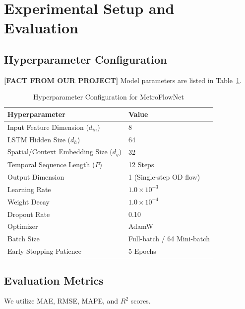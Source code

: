 \documentclass[conference]{IEEEtran}
\begin{document}
\section{Experimental Setup and Evaluation}
\label{sec:experiments}

\subsection{Hyperparameter Configuration}
\noindent \textbf{[FACT FROM OUR PROJECT]} Model parameters are listed in Table~\ref{tab:model_config}.

\begin{table}[htbp]
\caption{Hyperparameter Configuration for MetroFlowNet}
\label{tab:model_config}
\centering
\begin{tabular}{ll}
\toprule
\textbf{Hyperparameter} & \textbf{Value} \\
\midrule
Input Feature Dimension ($d_{in}$) & 8 \\
LSTM Hidden Size ($d_h$) & 64 \\
Spatial/Context Embedding Size ($d_g$) & 32 \\
Temporal Sequence Length ($P$) & 12 Steps \\
Output Dimension & 1 (Single-step OD flow) \\
Learning Rate & $1.0 \times 10^{-3}$ \\
Weight Decay & $1.0 \times 10^{-4}$ \\
Dropout Rate & 0.10 \\
Optimizer & AdamW \\
Batch Size & Full-batch / 64 Mini-batch \\
Early Stopping Patience & 5 Epochs \\
\bottomrule
\end{tabular}
\end{table}

\subsection{Evaluation Metrics}
\noindent We utilize MAE, RMSE, MAPE, and $R^2$ scores.

\end{document}
